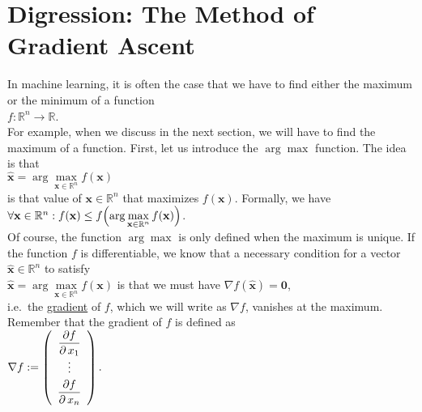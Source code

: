 \section{Digression: The Method of Gradient Ascent \label{section:gradient-ascent}}
In machine learning, it is often the case that we have to find either the maximum or the minimum of a function
\\[0.2cm]
\hspace*{1.3cm}
$f: \mathbb{R}^n \rightarrow \mathbb{R}$.
\\[0.2cm]
For example, when we discuss  in the next section, we will have to find the maximum of a
function.  First, let us introduce the $\arg\max$ function.  The idea is that
\\[0.2cm]
\hspace*{1.3cm}
$\mathbf{\widehat{x}} = \arg\max\limits_{\mathbf{x}\in \mathbb{R}^n} f(\mathbf{x})$
\\[0.2cm]
is that value of $\mathbf{x} \in \mathbb{R}^n$ that maximizes $ f(\mathbf{x})$.  Formally, we have
\\[0.2cm]
\hspace*{1.3cm}
$\forall \mathbf{x} \in \mathbb{R}^n : f(\mathbf{x}) \leq f\Bigl(\arg\max\limits_{\mathbf{x}\in \mathbb{R}^n} f(\mathbf{x})\Bigr)$.
\\[0.2cm]
Of course, the function $\arg\!\max$ is only defined when the maximum is unique.
If the function $f$ is differentiable, we know that a necessary condition for a vector $\mathbf{\widehat{x}} \in \mathbb{R}^n$
to satisfy
\\[0.2cm]
\hspace*{1.3cm}
$\mathbf{\widehat{x}} = \arg\max\limits_{\mathbf{x}\in \mathbb{R}^n} f(\mathbf{x})$ \quad is that we must have \quad $\nabla f(\mathbf{\widehat{x}}) = \mathbf{0}$,
\\[0.2cm]
i.e.~the \href{https://en.wikipedia.org/wiki/Gradient}{gradient} of $f$, which we will write as $\nabla f$,
vanishes at the maximum.  Remember that the gradient of $f$ is defined as
\\[0.2cm]
\hspace*{1.3cm}
$\nabla f := \left(
 \begin{array}{c}
 \displaystyle\frac{\partial f}{\partial\, x_1} \\
    \vdots                            \\[0.1cm]
 \displaystyle\frac{\partial f}{\partial\, x_n} \\ 
 \end{array}
 \right).
$

